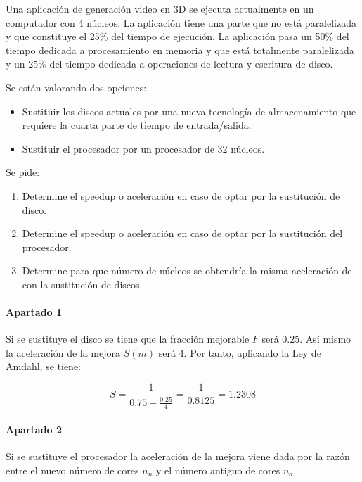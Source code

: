 \begin{acexercise}\end{acexercise}

Una aplicación de generación video en 3D se ejecuta actualmente en un
computador con 4 núcleos. La aplicación tiene una parte que no está
paralelizada y que constituye el 25\% del tiempo de ejecución. La aplicación
pasa un 50\% del tiempo dedicada a procesamiento en memoria y que está
totalmente paralelizada y un 25\% del tiempo dedicada a operaciones de lectura
y escritura de disco.

Se están valorando dos opciones:

\begin{itemize}
\item Sustituir los discos actuales por una nueva tecnología de almacenamiento que requiere la cuarta parte de tiempo de entrada/salida.
\item Sustituir el procesador por un procesador de 32 núcleos.
\end{itemize}

Se pide:

\begin{enumerate}
\item Determine el speedup o aceleración en caso de optar por la sustitución de disco.
\item Determine el speedup o aceleración en caso de optar por la sustitución del procesador.
\item Determine para que número de núcleos se obtendría la misma aceleración de con la sustitución de discos.
\end{enumerate}


\begin{acsolution}\end{acsolution}

\paragraph{Apartado 1}
Si se sustituye el disco se tiene que la fracción mejorable $F$ será $0.25$. Así
mismo la aceleración de la mejora $S(m)$ será $4$. Por tanto, aplicando la Ley de
Amdahl, se tiene:

\[
S = \frac{1}{0.75 + \frac{0.25}{4}} = \frac{1}{0.8125} =  1.2308
\]

\paragraph{Apartado 2}
Si se sustituye el procesador la aceleración de la mejora viene dada por la
razón entre el nuevo número de cores $n_n$ y el número antiguo de cores $n_a$.

